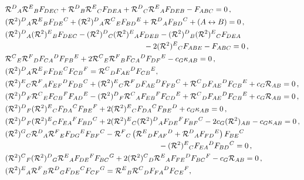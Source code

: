\documentclass[12pt]{article}
\def\RR{{\mathfrak R}}
\def\RR{{\mathfrak R}}
\def\R{{\mathbb R}}
\renewcommand{\R}{\mathcal{R}}
\renewcommand{\RR}{(\mathcal{R}^{2})}
\begin{document}
\begin{align}
&\R^{D}{}_{A}\R^{E}{}_{B} F_{DEC} +\R^{D}{}_{B}\R^{E}{}_{C} F_{DEA} +\R^{D}{}_{C}\R^{E}{}_{A} F_{DEB} -F_{ABC}= 0\,,\\
& \RR^{D}{}_{A} \R^{E}{}_{B} F_{DE}{}^C + \RR^{D}{}_{A}\R^{C}{}_{E} F_{BD}{}^E + \R^{D}{}_{A} F_{BD}{}^C + (A\leftrightarrow B) = 0\,,  \\
&\begin{multlined}[b][.9\textwidth] \RR^{D}{}_{A}\RR^{E}{}_{B} F_{DEC} - \RR^{D}{}_{C} \RR^{E}{}_{A} F_{DEB}-\RR^{D}{}_{B} \RR^{E}{}_{C} F_{DEA} \\- 2\RR^{E}{}_{C} F_{ABE} -F_{ABC}=0\,,\end{multlined} \\
& \R^{C}{}_{E} \R^{F}{}_{D} F_{CA}{}^{D} F_{FB}{}^{E} + 2 \R^{C}{}_{E} \R^{F}{}_{B} F_{CA}{}^{D} F_{DF}{}^{E} - c_G \kappa_{AB}=0\,,\\
& \RR^{D}{}_{A}\R^{E}{}_{F} F_{DE}{}^{C}F_{CB}{}^{F} = \R^{C}{}_{D} F_{AE}{}^{D}F_{CB}{}^{E},\\
& \RR^{E}{}_{C} \R^{F}{}_{A} F_{EF}{}^{D} F_{DB}{}^C + \RR^{E}{}_{C} \R^{F}{}_{D} F_{AE}{}^D F_{FB}{}^C + \R^{C}{}_{D} F_{AE}{}^D F_{CB}{}^E +c_G \R_{AB} = 0\,,\\
& \RR^{D}{}_{F} \R^{C}{}_{E} F_{CB}{}^{F} F_{AD}{}^{E} -  \RR^{D}{}_{F} \R^{C}{}_{A} F_{EB}{}^{F} F_{CD}{}^{E} + \R^{C}{}_{D} F_{AE}{}^{D} F_{CB}{}^{E} + c_G \R_{AB} = 0\,,\\
&\RR^{D}{}_{F} \RR^{E}{}_{C} F_{DA}{}^{C} F_{BE}{}^{F} + 2 \RR^{E}{}_{C} F_{DA}{}^{C}F_{BE}{}^{D} +c_G \kappa_{AB} = 0\,,\\
&\RR^{D}{}_{F} \RR^{E}{}_{C} F_{EA}{}^{F} F_{BD}{}^{C} +2 \RR^{E}{}_{C} \RR^{D}{}_{A} F_{DE}{}^{F}  F_{BF}{}^{C} - 2 c_G \RR_{AB} - c_G \kappa_{AB} = 0\,,\\
&\begin{multlined}[b][.89\textwidth] \RR^{G}{}_{C} \R^{D}{}_{A} \R^{F}{}_{E} F_{DG}{}^{E} F_{BF}{}^{C} - \R^{F}{}_{C} \left( \R^{E}{}_{D} F_{AF}{}^{D} + \R^{D}{}_{A} F_{FD}{}^{E}  \right)   F_{BE}{}^{C}\\
  - \RR^{E}{}_{C} F_{EA}{}^{D} F_{BD}{}^{C} = 0\,, \end{multlined} \\
&\RR^{C}{}_{F} \RR^{D}{}_{G} \R^{E}{}_{A} F_{DE}{}^{F} F_{BC}{}^{G} + 2 \RR^{C}{}_{D}\R^{E}{}_{A}  F_{FE}{}^{D} F_{BC}{}^{F} - c_G \R_{AB} = 0\,,\\
&\RR^{E}{}_{A} \R^{F}{}_{B} \R^{D}{}_{G} F_{DE}{}^{C} F_{CF}{}^{G} = \R^{E}{}_{B} \R^{C}{}_{D} F_{FA}{}^{D}F_{CE}{}^{F},\\

\end{align}
\end{document}
